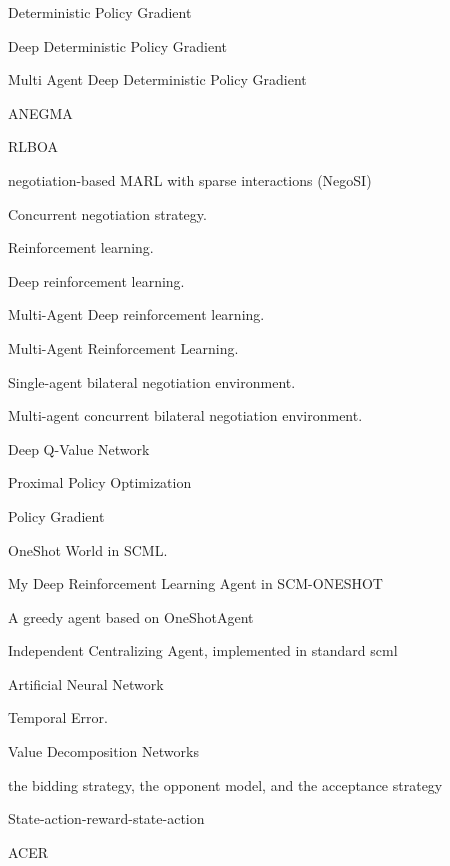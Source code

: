 %
{%
Deterministic Policy Gradient
}

%
{%
Deep Deterministic Policy Gradient
}

%
{%
Multi Agent Deep Deterministic Policy Gradient
}

%
{%
ANEGMA
}

%
{%
RLBOA
}

%
{%
negotiation-based MARL with sparse interactions (NegoSI)
}

%
{%
Concurrent negotiation strategy.
}

%
{%
Reinforcement learning.
}

%
{%
Deep reinforcement learning.
}

%
{%
Multi-Agent Deep reinforcement learning.
}

%
{%
Multi-Agent Reinforcement Learning.
}

%
{%
Single-agent bilateral negotiation environment.
}

%
{%
Multi-agent concurrent bilateral negotiation environment.
}

%
{%
Deep Q-Value Network
}

%
{%
Proximal Policy Optimization
}

%
{%
Policy Gradient
}

%
{%
OneShot World in SCML.
}

%
{%
My Deep Reinforcement Learning Agent in SCM-ONESHOT
}

%
{%
A greedy agent based on OneShotAgent
}

%
{%
Independent Centralizing Agent, implemented in standard scml
}

%
{%
Artificial Neural Network
}

%
{%
Temporal Error.
}

%
{%
Value Decomposition Networks
}

%
{%
the bidding strategy, the opponent model, and the acceptance strategy
}

%
{%
State-action-reward-state-action
}

%
{%
ACER
}

